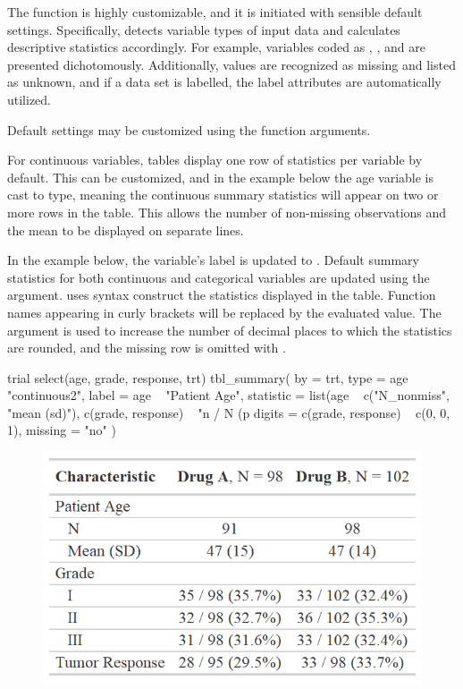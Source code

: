 The function is highly customizable, and it is initiated with sensible default settings.
Specifically,  detects variable types of input data and calculates descriptive statistics accordingly.
For example, variables coded as , , and  are presented dichotomously.
Additionally,  values are recognized as missing and listed as unknown, and if a data set is labelled, the label attributes are automatically utilized. 

Default settings may be customized using the  function arguments.



For continuous variables, tables display one row of statistics per variable by default.
This can be customized, and in the example below the age variable is cast to  type, meaning the continuous summary statistics will appear on two or more rows in the table. 
This allows the number of non-missing observations and the mean to be displayed on separate lines.

In the example below, the  variable's label is updated to .
Default summary statistics for both continuous and categorical variables are updated using the  argument. 
 uses  \citep{glue} syntax construct the statistics displayed in the table.
Function names appearing in curly brackets will be replaced by the evaluated value.
The  argument is used to increase the number of decimal places to which the statistics are rounded, and the missing row is omitted with .

\begin{example}
trial %
  select(age, grade, response, trt) %
  tbl_summary(
    by = trt,
    type = age ~ "continuous2",
    label = age ~ "Patient Age",
    statistic = list(age ~ c("{N_nonmiss}", "{mean} ({sd})"),
                     c(grade, response) ~ "{n} / {N} ({p}%
    digits = c(grade, response) ~ c(0, 0, 1),
    missing = "no"
  )
\end{example}
\begin{figure}[h!]
  \includegraphics[scale=0.49]{summary_plus.png}
  \centering
\end{figure}

